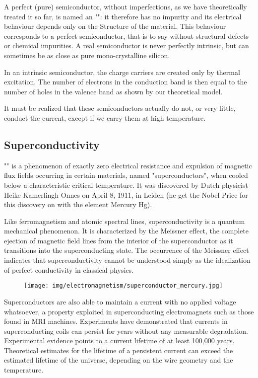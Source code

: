 	A perfect (pure) semiconductor, without imperfections, as we have theoretically treated it so far, is named an "": it therefore has no impurity and its electrical behaviour depends only on the Structure of the material. This behaviour corresponds to a perfect semiconductor, that is to say without structural defects or chemical impurities. A real semiconductor is never perfectly intrinsic, but can sometimes be as close as pure mono-crystalline silicon.

	In an intrinsic semiconductor, the charge carriers are created only by thermal excitation. The number of electrons in the conduction band is then equal to the number of holes in the valence band as shown by our theoretical model.

	It must be realized that these semiconductors actually do not, or very little, conduct the current, except if we carry them at high temperature.
	
	
	\pagebreak
	\subsection{Superconductivity}\label{superconductivity}
	"" is a phenomenon of exactly zero electrical resistance and expulsion of magnetic flux fields occurring in certain materials, named "superconductors", when cooled below a characteristic critical temperature. It was discovered by Dutch physicist Heike Kamerlingh Onnes on April 8, 1911, in Leiden (he get the Nobel Price for this discovery on with the element Mercury $\mathrm{Hg}$). 
	
	Like ferromagnetism and atomic spectral lines, superconductivity is a quantum mechanical phenomenon. It is characterized by the Meissner effect, the complete ejection of magnetic field lines from the interior of the superconductor as it transitions into the superconducting state. The occurrence of the Meissner effect indicates that superconductivity cannot be understood simply as the idealization of perfect conductivity in classical physics.
	\begin{figure}[H]
		\centering
		\texttt{[image: img/electromagnetism/superconductor\_mercury.jpg]}
	\end{figure}
	Superconductors are also able to maintain a current with no applied voltage whatsoever, a property exploited in superconducting electromagnets such as those found in MRI machines. Experiments have demonstrated that currents in superconducting coils can persist for years without any measurable degradation. Experimental evidence points to a current lifetime of at least 100,000 years. Theoretical estimates for the lifetime of a persistent current can exceed the estimated lifetime of the universe, depending on the wire geometry and the temperature.
	
